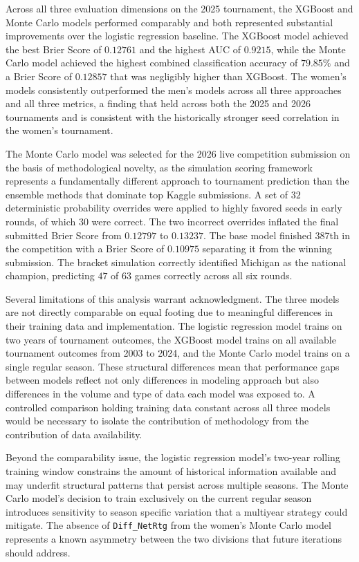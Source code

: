 \documentclass[12pt,leqno]{article}\usepackage[pdftex]{graphicx}\usepackage[dvipsnames]{xcolor}
\theoremstyle{remark}
\begin{document}
Across all three evaluation dimensions on the 2025 tournament, the XGBoost and Monte Carlo models performed comparably and both represented substantial improvements over the logistic regression baseline. The XGBoost model achieved the best Brier Score of $0.12761$ and the highest AUC of $0.9215$, while the Monte Carlo model achieved the highest combined classification accuracy of $79.85\%$ and a Brier Score of $0.12857$ that was negligibly higher than XGBoost. The women's models consistently outperformed the men's models across all three approaches and all three metrics, a finding that held across both the 2025 and 2026 tournaments and is consistent with the historically stronger seed correlation in the women's tournament.

The Monte Carlo model was selected for the 2026 live competition submission on the basis of methodological novelty, as the simulation scoring framework represents a fundamentally different approach to tournament prediction than the ensemble methods that dominate top Kaggle submissions. A set of $32$ deterministic probability overrides were applied to highly favored seeds in early rounds, of which $30$ were correct. The two incorrect overrides inflated the final submitted Brier Score from $0.12797$ to $0.13237$. The base model finished 387th in the competition with a Brier Score of $0.10975$ separating it from the winning submission. The bracket simulation correctly identified Michigan as the national champion, predicting $47$ of $63$ games correctly across all six rounds.

Several limitations of this analysis warrant acknowledgment. The three models are not directly comparable on equal footing due to meaningful differences in their training data and implementation. The logistic regression model trains on two years of tournament outcomes, the XGBoost model trains on all available tournament outcomes from 2003 to 2024, and the Monte Carlo model trains on a single regular season. These structural differences mean that performance gaps between models reflect not only differences in modeling approach but also differences in the volume and type of data each model was exposed to. A controlled comparison holding training data constant across all three models would be necessary to isolate the contribution of methodology from the contribution of data availability.

Beyond the comparability issue, the logistic regression model's two-year rolling training window constrains the amount of historical information available and may underfit structural patterns that persist across multiple seasons. The Monte Carlo model's decision to train exclusively on the current regular season introduces sensitivity to season specific variation that a multiyear strategy could mitigate. The absence of \texttt{Diff\_NetRtg} from the women's Monte Carlo model represents a known asymmetry between the two divisions that future iterations should address.
\end{document}
